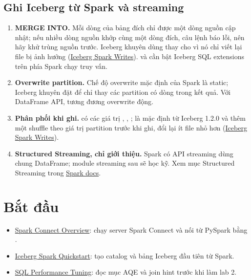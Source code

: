 \subsection{Ghi Iceberg từ Spark và streaming}
\begin{enumerate}[resume]
  \item \textbf{MERGE INTO.} Mỗi dòng của bảng đích chỉ được một dòng nguồn cập nhật; nếu nhiều dòng nguồn khớp cùng một dòng đích, câu lệnh báo lỗi, nên hãy khử trùng nguồn trước. Iceberg khuyên dùng  thay cho  vì nó chỉ viết lại file bị ảnh hưởng (\href{https://iceberg.apache.org/docs/latest/spark-writes/}{Iceberg Spark Writes}).  và  cần bật Iceberg SQL extensions trên phía Spark chạy truy vấn.
  \item \textbf{Overwrite partition.} Chế độ overwrite mặc định của Spark là static; Iceberg khuyên đặt  để chỉ thay các partition có dòng trong kết quả. Với DataFrame API,  tương đương overwrite động.
  \item \textbf{Phân phối khi ghi.}  có các giá trị , , ;  là mặc định từ Iceberg 1.2.0 và thêm một shuffle theo giá trị partition trước khi ghi, đổi lại ít file nhỏ hơn (\href{https://iceberg.apache.org/docs/latest/spark-writes/}{Iceberg Spark Writes}).
  \item \textbf{Structured Streaming, chỉ giới thiệu.} Spark có API streaming dùng chung DataFrame; module streaming sau sẽ học kỹ. Xem mục Structured Streaming trong \href{https://spark.apache.org/docs/latest/}{Spark docs}.
\end{enumerate}

\section{Bắt đầu}
\begin{itemize}
  \item \href{https://spark.apache.org/docs/latest/spark-connect-overview.html}{Spark Connect Overview}: chạy server Spark Connect và nối từ PySpark bằng .
  \item \href{https://iceberg.apache.org/spark-quickstart/}{Iceberg Spark Quickstart}: tạo catalog và bảng Iceberg đầu tiên từ Spark.
  \item \href{https://spark.apache.org/docs/latest/sql-performance-tuning.html}{SQL Performance Tuning}: đọc mục AQE và join hint trước khi làm lab 2.
\end{itemize}

